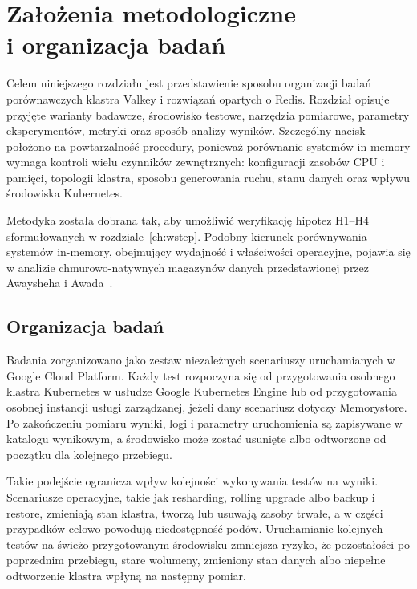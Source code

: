 \chapter[Założenia metodologiczne i organizacja badań]{Założenia metodologiczne \\i organizacja badań}\label{ch:organizacja}

Celem niniejszego rozdziału jest przedstawienie sposobu organizacji badań porównawczych klastra Valkey i rozwiązań opartych o Redis. Rozdział opisuje przyjęte warianty badawcze, środowisko testowe, narzędzia pomiarowe, parametry eksperymentów, metryki oraz sposób analizy wyników. Szczególny nacisk położono na powtarzalność procedury, ponieważ porównanie systemów in-memory wymaga kontroli wielu czynników zewnętrznych: konfiguracji zasobów CPU i pamięci, topologii klastra, sposobu generowania ruchu, stanu danych oraz wpływu środowiska Kubernetes.

Metodyka została dobrana tak, aby umożliwić weryfikację hipotez H1--H4 sformułowanych w rozdziale~\ref{ch:wstep}. Podobny kierunek porównywania systemów in-memory, obejmujący wydajność i właściwości operacyjne, pojawia się w analizie chmurowo-natywnych magazynów danych przedstawionej przez Awaysheha i Awada~\cite{awaysheh2025}.

\section{Organizacja badań}

Badania zorganizowano jako zestaw niezależnych scenariuszy uruchamianych w Google Cloud Platform. Każdy test rozpoczyna się od przygotowania osobnego klastra Kubernetes w usłudze Google Kubernetes Engine lub od przygotowania osobnej instancji usługi zarządzanej, jeżeli dany scenariusz dotyczy Memorystore. Po zakończeniu pomiaru wyniki, logi i parametry uruchomienia są zapisywane w katalogu wynikowym, a środowisko może zostać usunięte albo odtworzone od początku dla kolejnego przebiegu.

Takie podejście ogranicza wpływ kolejności wykonywania testów na wyniki. Scenariusze operacyjne, takie jak resharding, rolling upgrade albo backup i restore, zmieniają stan klastra, tworzą lub usuwają zasoby trwałe, a w części przypadków celowo powodują niedostępność podów. Uruchamianie kolejnych testów na świeżo przygotowanym środowisku zmniejsza ryzyko, że pozostałości po poprzednim przebiegu, stare wolumeny, zmieniony stan danych albo niepełne odtworzenie klastra wpłyną na następny pomiar.


